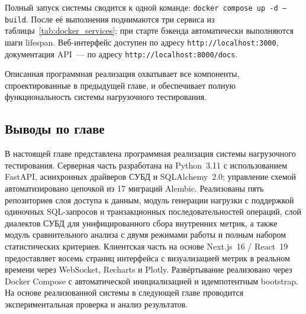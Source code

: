 Полный запуск системы сводится к одной команде: \texttt{docker compose up -d --build}. После её выполнения поднимаются три сервиса из таблицы~\ref{tab:docker_services}; при старте бэкенда автоматически выполняются шаги lifespan. Веб-интерфейс доступен по адресу \texttt{http://localhost:3000}, документация API~--- по адресу \texttt{http://localhost:8000/docs}.

Описанная программная реализация охватывает все компоненты, спроектированные в предыдущей главе, и обеспечивает полную функциональность системы нагрузочного тестирования.

\subsection{Выводы по главе}

В настоящей главе представлена программная реализация системы нагрузочного тестирования. Серверная часть разработана на Python~3.11 с использованием FastAPI, асинхронных драйверов СУБД и SQLAlchemy~2.0; управление схемой автоматизировано цепочкой из 17 миграций Alembic. Реализованы пять репозиториев слоя доступа к данным, модуль генерации нагрузки с поддержкой одиночных SQL-запросов и транзакционных последовательностей операций, слой диалектов СУБД для унифицированного сбора внутренних метрик, а также модуль сравнительного анализа с двумя режимами работы и полным набором статистических критериев. Клиентская часть на основе Next.js~16 / React~19 предоставляет восемь страниц интерфейса с визуализацией метрик в реальном времени через WebSocket, Recharts и Plotly. Развёртывание реализовано через Docker Compose с автоматической инициализацией и идемпотентным bootstrap. На основе реализованной системы в следующей главе проводится экспериментальная проверка и анализ результатов.

